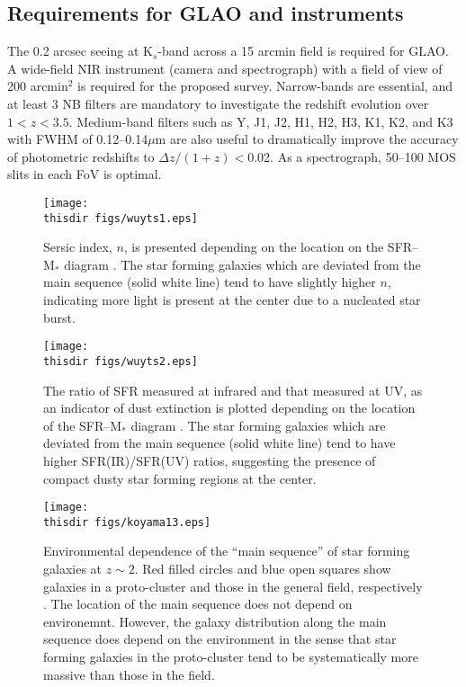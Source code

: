 \subsection{Requirements for GLAO and instruments}

The 0.2 arcsec seeing at K$_s$-band across a 15 arcmin field is required
for GLAO. A wide-field NIR instrument (camera and spectrograph) with a
field of view of 200 arcmin$^2$ is required for the proposed survey. 
Narrow-bands are essential, and at least 3 NB filters are mandatory to
investigate the redshift evolution over $1<z<3.5$.
Medium-band filters such as Y, J1, J2, H1, H2, H3, K1, K2, and K3 
with FWHM of 0.12--0.14$\mu$m are also useful to dramatically improve
the accuracy of photometric redshifts to $\Delta$$z/(1+z)$$<$0.02. 
As a spectrograph, 50--100 MOS slits in each FoV is optimal.

\begin{figure}%
\centerline{
\texttt{[image: \\thisdir figs/wuyts1.eps]}
}
\caption{
Sersic index, $n$, is presented depending on the location on the
 SFR--M$_{*}$ diagram \citep{wuyts11}. 
The star forming galaxies which are deviated from the main sequence 
(solid white line) tend to have slightly higher $n$, indicating more
 light is present at the center due to a nucleated star burst. 
}
\label{fig:}
\end{figure}

\begin{figure}%
\centerline{
\texttt{[image: \\thisdir figs/wuyts2.eps]}
}
\caption{
The ratio of SFR measured at infrared and that measured at UV, as an
 indicator of dust extinction is plotted depending on the location of
 the SFR--M$_{*}$ diagram \citep{wuyts11}. 
The star forming galaxies which are deviated from the main sequence 
(solid white line) tend to have higher SFR(IR)/SFR(UV) ratios,
 suggesting the presence of compact dusty star forming regions at the
 center. 
}
\label{fig:}
\end{figure}


\begin{figure}%
\centerline{
\texttt{[image: \\thisdir figs/koyama13.eps]}
}
\caption{
Environmental dependence of the ``main sequence'' of star forming
 galaxies at $z\sim2$. 
Red filled circles and blue open squares show galaxies in a
 proto-cluster and those in the general field, respectively 
\citep{koyama13a}.
The location of the main sequence does not depend on
 environemnt. However, the galaxy distribution along the main sequence 
 does depend on the environment in the sense that star forming galaxies
 in the proto-cluster tend to be systematically more massive than 
those in the field.
}
\label{fig:}
\end{figure}


